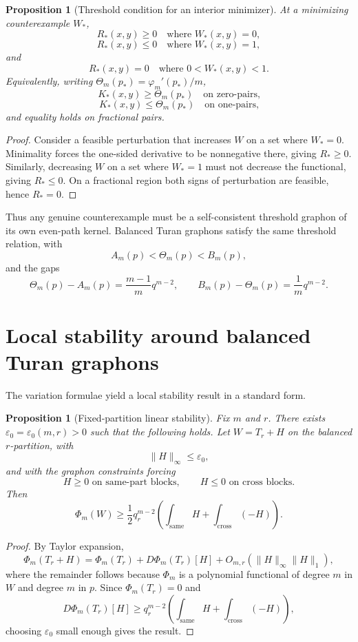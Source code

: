 \documentclass[11pt]{article}
\newtheorem{proposition}[theorem]{Proposition}
\theoremstyle{definition}
\newcommand{\eps}{\varepsilon}
\newcommand{\same}{\mathrm{same}}
\newcommand{\cross}{\mathrm{cross}}
\newcommand{\norm}[1]{\lVert #1\rVert}
\begin{document}
\begin{proposition}[Threshold condition for an interior minimizer]
At a minimizing counterexample $W_*$,
\[
        R_*(x,y)\ge0\quad\text{where } W_*(x,y)=0,
\]
\[
        R_*(x,y)\le0\quad\text{where } W_*(x,y)=1,
\]
and
\[
        R_*(x,y)=0\quad\text{where }0<W_*(x,y)<1.
\]
Equivalently, writing $\Theta_m(p_*)=\varphi_m'(p_*)/m$,
\[
        K_*(x,y)\ge\Theta_m(p_*)\quad\text{on zero-pairs,}
\]
\[
        K_*(x,y)\le\Theta_m(p_*)\quad\text{on one-pairs,}
\]
and equality holds on fractional pairs.
\end{proposition}

\begin{proof}
Consider a feasible perturbation that increases $W$ on a set where $W_*=0$.  Minimality forces the one-sided derivative to be nonnegative there, giving $R_*\ge0$.  Similarly, decreasing $W$ on a set where $W_*=1$ must not decrease the functional, giving $R_*\le0$.  On a fractional region both signs of perturbation are feasible, hence $R_*=0$.
\end{proof}

Thus any genuine counterexample must be a self-consistent threshold graphon of its own even-path kernel.  Balanced Turan graphons satisfy the same threshold relation, with
\[
        A_m(p)<\Theta_m(p)<B_m(p),
\]
and the gaps
\[
        \Theta_m(p)-A_m(p)=\frac{m-1}{m}q^{m-2},
        \qquad
        B_m(p)-\Theta_m(p)=\frac1m q^{m-2}.
\]

\section{Local stability around balanced Turan graphons}

The variation formulae yield a local stability result in a standard form.

\begin{proposition}[Fixed-partition linear stability]
Fix $m$ and $r$.  There exists $\eps_0=\eps_0(m,r)>0$ such that the following holds.  Let $W=T_r+H$ on the balanced $r$-partition, with
\[
        \norm{H}_\infty\le\eps_0,
\]
and with the graphon constraints forcing
\[
        H\ge0\text{ on same-part blocks},
        \qquad
        H\le0\text{ on cross blocks}.
\]
Then
\[
        \Phi_m(W)
        \ge\frac12q_r^{m-2}\left(
        \int_{\same}H+\int_{\cross}(-H)
        \right).
\]
\end{proposition}

\begin{proof}
By Taylor expansion,
\[
        \Phi_m(T_r+H)=\Phi_m(T_r)+D\Phi_m(T_r)[H]+O_{m,r}(\norm{H}_\infty \norm{H}_1),
\]
where the remainder follows because $\Phi_m$ is a polynomial functional of degree $m$ in $W$ and degree $m$ in $p$.  Since $\Phi_m(T_r)=0$ and
\[
        D\Phi_m(T_r)[H]
        \ge q_r^{m-2}\left(\int_{\same}H+\int_{\cross}(-H)\right),
\]
choosing $\eps_0$ small enough gives the result.
\end{proof}
\end{document}
